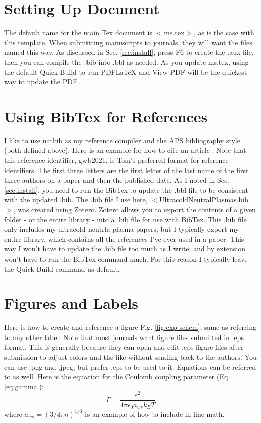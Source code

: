 \documentclass[11pt]{article}		%
\begin{document}
\section{Setting Up Document}
\label{sec:setup}
The default name for the main Tex document is $<$ms.tex$>$, as is the case with this template. When submitting manuscripts to journals, they will want the files named this way. As discussed in Sec. \ref{sec:install}, press F6 to create the .aux file, then you can compile the .bib into .bbl as needed. As you update ms.tex, using the default Quick Build to run PDFLaTeX and View PDF will be the quickest way to update the PDF.

\section{Using BibTex for References}
\label{sec:bib}

I like to use natbib as my reference compiler and the APS bibliography style (both defined above). Here is an example for how to cite an article \cite{gwb2021}. Note that this reference identifier, gwb2021, is Tom's preferred format for reference identifiers. The first three letters are the first letter of the last name of the first three authors on a paper and then the published date. As I noted in Sec. \ref{sec:install}, you need to run the BibTex to update the .bbl file to be consistent with the updated .bib. The .bib file I use here, $<$UltracoldNeutralPlasmas.bib$>$, was created using Zotero. Zotero allows you to export the contents of a given folder - or the entire library - into a .bib file for use with BibTex. This .bib file only includes my ultracold neutrla plasma papers, but I typically export my entire library, which contains all the references I've ever used in a paper. This way I won't have to update the .bib file too much as I write, and by extension won't have to run the BibTex command much. For this reason I typically leave the Quick Build command as default.

\section{Figures and Labels}
\label{sec:figs}

Here is how to create and reference a figure Fig. \ref{fig:exp-schem}, same as referring to any other label. Note that most journals want figure files submitted in .eps format. This is generally because they can open and edit .eps figure files after submission to adjust colors and the like without sending back to the authors. You can use .png and .jpeg, but prefer .eps to be used to it. Equations can be referred to as well. Here is the equation for the Coulomb coupling parameter (Eq. \ref{eq:gamma}):
\begin{equation}
\label{eq:gamma}
\Gamma=\frac{e^2}{4\pi\epsilon_0 a_{ws} k_B T}
\end{equation}
where $a_{ws}=(3/4\pi n)^{1/3}$ is an example of how to include in-line math.
\end{document}
